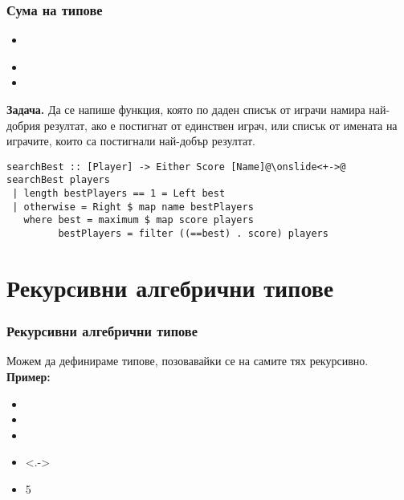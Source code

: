 \documentclass[alsotrans]{beamerswitch}
\begin{document}
\begin{frame}[fragile]
  \frametitle{Сума на типове}
  \begin{itemize}[<+->]
  \item {}\\
      \hspace{5em}
  \item {}
  \item {}
  \end{itemize}
  \onslide<+->
  \textbf{Задача.} Да се напише функция, която по даден списък от играчи намира най-добрия резултат, ако е постигнат от единствен играч, или списък от имената на играчите, които са постигнали най-добър резултат.
  \onslide<+->
\begin{lstlisting}
searchBest :: [Player] -> Either Score [Name]@\onslide<+->@
searchBest players
 | length bestPlayers == 1 = Left best
 | otherwise = Right $ map name bestPlayers
   where best = maximum $ map score players
         bestPlayers = filter ((==best) . score) players
\end{lstlisting}
\end{frame}

\section{Рекурсивни алгебрични типове}

\begin{frame}[fragile]
  \frametitle{Рекурсивни алгебрични типове}
  Можем да дефинираме типове, позовавайки се на самите тях \alert{рекурсивно}.\\[2ex]
  \pause
  \textbf{Пример:}
  \begin{itemize}[<+->]
  \item {}
  \item {}
  \item {}
  \item<.-> 
  \item {}5
  \end{itemize}
\end{frame}
\end{document}
